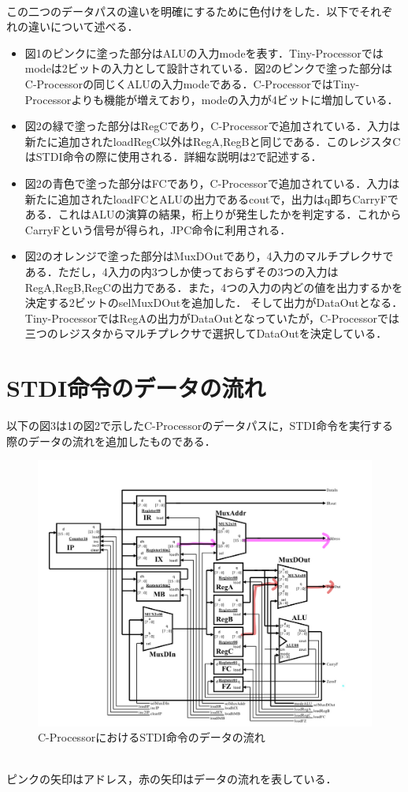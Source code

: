 \documentclass[dvipdfmx]{jarticle}
\begin{document}
\\この二つのデータパスの違いを明確にするために色付けをした．以下でそれぞれの違いについて述べる．
\begin{itemize}
  \item 図1のピンクに塗った部分はALUの入力modeを表す．Tiny-Processorではmodeは2ビットの入力として設計されている．図2のピンクで塗った部分は
  C-Processorの同じくALUの入力modeである．C-ProcessorではTiny-Processorよりも機能が増えており，modeの入力が4ビットに増加している．
  \item 図2の緑で塗った部分はRegCであり，C-Processorで追加されている．入力は新たに追加されたloadRegC以外はRegA,RegBと同じである．このレジスタCはSTDI命令の際に使用される．詳細な説明は2で記述する．
  \item 図2の青色で塗った部分はFCであり，C-Processorで追加されている．入力は新たに追加されたloadFCとALUの出力であるcoutで，出力はq即ちCarryFである．これはALUの演算の結果，桁上りが発生したかを判定する．これからCarryFという信号が得られ，JPC命令に利用される．
  \item 図2のオレンジで塗った部分はMuxDOutであり，4入力のマルチプレクサである．ただし，4入力の内3つしか使っておらずその3つの入力はRegA,RegB,RegCの出力である．また，4つの入力の内どの値を出力するかを決定する2ビットのselMuxDOutを追加した．
  そして出力がDataOutとなる．Tiny-ProcessorではRegAの出力がDataOutとなっていたが，C-Processorでは三つのレジスタからマルチプレクサで選択してDataOutを決定している．
\end{itemize}
\clearpage
\section{STDI命令のデータの流れ}
以下の図3は1の図2で示したC-Processorのデータパスに，STDI命令を実行する際のデータの流れを追加したものである．
\begin{figure}[h]
  \centering
  \includegraphics[width = 12cm]{STDI.png}
  \caption{C-ProcessorにおけるSTDI命令のデータの流れ}  
\end{figure}
\\ピンクの矢印はアドレス，赤の矢印はデータの流れを表している．
\end{document}

